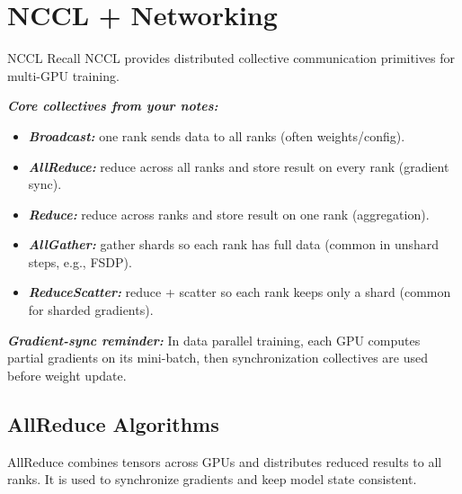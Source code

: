 \documentclass[12pt]{article}
\let\origtextbf\textbf
\renewcommand{\textbf}[1]{\origtextbf{\textit{#1}}}
\begin{document}
\section{NCCL + Networking}

\begin{bluebox}{NCCL Recall}
NCCL provides distributed collective communication primitives for multi-GPU training.
\end{bluebox}

\textbf{Core collectives from your notes:}
\begin{itemize}
\item \textbf{Broadcast:} one rank sends data to all ranks (often weights/config).
\item \textbf{AllReduce:} reduce across all ranks and store result on every rank (gradient sync).
\item \textbf{Reduce:} reduce across ranks and store result on one rank (aggregation).
\item \textbf{AllGather:} gather shards so each rank has full data (common in unshard steps, e.g., FSDP).
\item \textbf{ReduceScatter:} reduce + scatter so each rank keeps only a shard (common for sharded gradients).
\end{itemize}

\textbf{Gradient-sync reminder:}
In data parallel training, each GPU computes partial gradients on its mini-batch, then synchronization collectives are used before weight update.

\subsection{AllReduce Algorithms}
AllReduce combines tensors across GPUs and distributes reduced results to all ranks. It is used to synchronize gradients and keep model state consistent.
\end{document}
